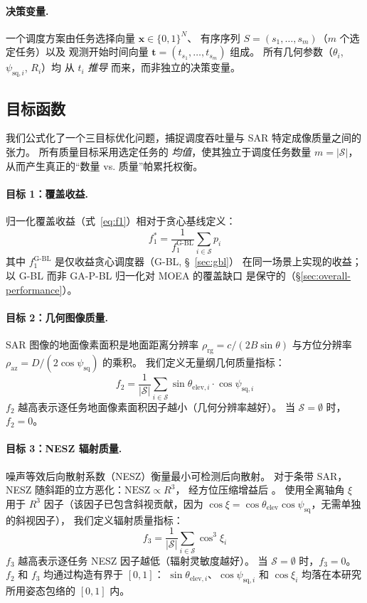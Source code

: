 \documentclass[preprint,12pt,authoryear]{elsarticle}
\begin{document}
\paragraph{决策变量.}
一个调度方案由任务选择向量 $\mathbf{x} \in \{0,1\}^N$、
有序序列 $S = (s_1,\ldots,s_m)$（$m$ 个选定任务）以及
观测开始时间向量 $\mathbf{t} = (t_{s_1},\ldots,t_{s_m})$ 组成。
所有几何参数（$\theta_i$, $\psi_{\text{sq},i}$, $R_i$）均
从 $t_i$ \emph{推导} 而来，而非独立的决策变量。
\subsection{目标函数}\label{sec:objective-functions}
我们公式化了一个三目标优化问题，捕捉调度吞吐量与 SAR 特定成像质量之间的张力。
所有质量目标采用选定任务的 \emph{均值}，使其独立于调度任务数量 $m = |\mathcal{S}|$，
从而产生真正的“数量 vs. 质量”帕累托权衡。
\paragraph{目标 1：覆盖收益.}
归一化覆盖收益（式~\ref{eq:f1}）相对于贪心基线定义：
\begin{equation}
f_1^* = \frac{1}{f_1^{\text{G-BL}}} \sum_{i \in \mathcal{S}} p_i
\label{eq:f1}
\end{equation}
其中 $f_1^{\text{G-BL}}$ 是仅收益贪心调度器（G-BL, \S~\ref{sec:gbl}）
在同一场景上实现的收益；以 G-BL 而非 GA-P-BL 归一化对 MOEA 的覆盖缺口
是保守的（\S\ref{sec:overall-performance}）。
\paragraph{目标 2：几何图像质量.}
SAR 图像的地面像素面积是地面距离分辨率 $\rho_{\text{rg}} = c / (2B \sin\theta)$
与方位分辨率 $\rho_{\text{az}} = D / (2 \cos\psi_{\text{sq}})$ 的乘积。
我们定义无量纲几何质量指标：
\begin{equation}
f_2 = \frac{1}{|\mathcal{S}|} \sum_{i \in \mathcal{S}} \sin\theta_{\text{elev},i} \cdot \cos\psi_{\text{sq},i}
\label{eq:f2}
\end{equation}
$f_2$ 越高表示逐任务地面像素面积因子越小（几何分辨率越好）。
当 $\mathcal{S} = \emptyset$ 时，$f_2 = 0$。
\paragraph{目标 3：NESZ 辐射质量.}
噪声等效后向散射系数（NESZ）衡量最小可检测后向散射。
对于条带 SAR，NESZ 随斜距的立方恶化：$\text{NESZ} \propto R^3$，
经方位压缩增益后 \citep{Curlander1991}。
使用全离轴角 $\xi$ 用于 $R^3$ 因子（该因子已包含斜视贡献，因为
$\cos\xi = \cos\theta_{\text{elev}}\cos\psi_{\text{sq}}$，无需单独的斜视因子），
我们定义辐射质量指标：
\begin{equation}
f_3 = \frac{1}{|\mathcal{S}|} \sum_{i \in \mathcal{S}} \cos^3\xi_i
\label{eq:f3}
\end{equation}
$f_3$ 越高表示逐任务 NESZ 因子越低（辐射灵敏度越好）。
当 $\mathcal{S} = \emptyset$ 时，$f_3 = 0$。
$f_2$ 和 $f_3$ 均通过构造有界于 $[0,1]$：
$\sin\theta_{\text{elev},i}$、$\cos\psi_{\text{sq},i}$ 和 $\cos\xi_i$ 均落在本研究所用姿态包络的 $[0,1]$ 内。
\end{document}
